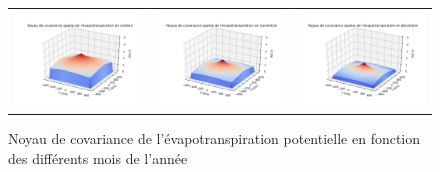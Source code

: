 \documentclass[a4paper,11pt]{article}
\numberwithin{equation}{section}
\begin{document}
\begin{figure}[H]
\begin{tabular}{ccc}
	\includegraphics[scale=0.34]{images/kernel_evap_m10.png} & \includegraphics[scale=0.34]{images/kernel_evap_m11.png} & \includegraphics[scale=0.34]{images/kernel_evap_m12.png} \\
\end{tabular} 
	\caption{Noyau de covariance de l'évapotranspiration potentielle en fonction des différents mois de l'année}
\end{figure}
\end{document}
